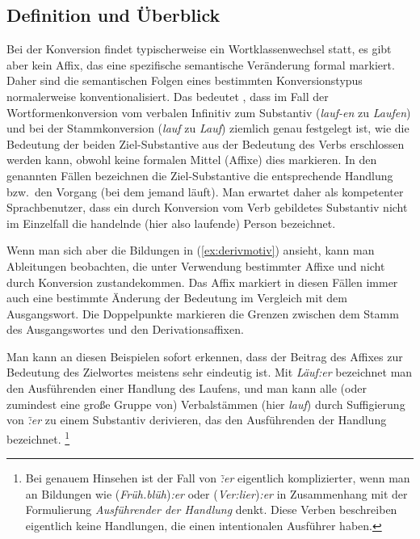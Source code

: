 \label{sec:deriv}

\subsection{Definition und Überblick}

Bei der Konversion findet typischerweise ein Wortklassenwechsel statt, es gibt aber kein Affix, das eine spezifische semantische Veränderung formal markiert.
Daher sind die semantischen Folgen eines bestimmten Konversionstypus normalerweise konventionalisiert. 
Das bedeutet \zB, dass im Fall der Wortformenkonversion vom verbalen Infinitiv zum Substantiv (\textit{lauf-en} zu \textit{Laufen}) und bei der Stammkonversion (\textit{lauf} zu \textit{Lauf}) ziemlich genau festgelegt ist, wie die Bedeutung der beiden Ziel-Substantive aus der Bedeutung des Verbs erschlossen werden kann, obwohl keine formalen Mittel (Affixe) dies markieren.
In den genannten Fällen bezeichnen die Ziel-Substantive die entsprechende Handlung bzw.\ den Vorgang (bei dem jemand läuft).
Man erwartet daher als kompetenter Sprachbenutzer, dass ein durch Konversion vom Verb gebildetes Substantiv \zB nicht im Einzelfall die handelnde (hier also laufende) Person bezeichnet.

Wenn man sich aber die Bildungen in (\ref{ex:derivmotiv}) ansieht, kann man Ableitungen beobachten, die unter Verwendung bestimmter Affixe und nicht durch Konversion zustandekommen.
Das Affix markiert in diesen Fällen immer auch eine bestimmte Änderung der Bedeutung im Vergleich mit dem Ausgangswort.
Die Doppelpunkte markieren die Grenzen zwischen dem Stamm des Ausgangswortes und den Derivationsaffixen.

\begin{exe}
  \ex\label{ex:derivmotiv}
  \begin{xlist}
  \end{xlist}
\end{exe}

Man kann an diesen Beispielen sofort erkennen, dass der Beitrag des Affixes zur Bedeutung des Zielwortes meistens sehr eindeutig ist.
Mit \textit{Läuf:er} bezeichnet man den Ausführenden einer Handlung des Laufens, und man kann alle (oder zumindest eine große Gruppe von) Verbalstämmen (hier \textit{lauf}) durch Suffigierung von \textit{\~:er} zu einem Substantiv derivieren, das den Ausführenden der Handlung bezeichnet.%
\footnote{Bei genauem Hinsehen ist der Fall von \textit{\~:er} eigentlich komplizierter, wenn man an Bildungen wie (\textit{Früh.blüh})\textit{:er} oder (\textit{Ver:lier})\textit{:er} in Zusammenhang mit der Formulierung \textit{Ausführender der Handlung} denkt.
Diese Verben beschreiben eigentlich keine Handlungen, die einen intentionalen Ausführer haben.}

